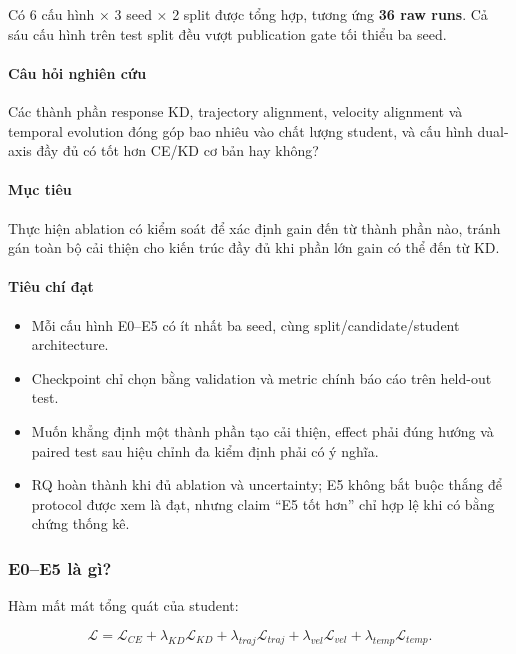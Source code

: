 Có 6 cấu hình × 3 seed × 2 split được tổng hợp, tương ứng \textbf{36 raw runs}. Cả sáu cấu hình trên test split đều vượt publication gate tối thiểu ba seed.

\paragraph{Câu hỏi nghiên cứu}

Các thành phần response KD, trajectory alignment, velocity alignment và temporal evolution đóng góp bao nhiêu vào chất lượng student, và cấu hình dual-axis đầy đủ có tốt hơn CE/KD cơ bản hay không?

\paragraph{Mục tiêu}

Thực hiện ablation có kiểm soát để xác định gain đến từ thành phần nào, tránh gán toàn bộ cải thiện cho kiến trúc đầy đủ khi phần lớn gain có thể đến từ KD.

\paragraph{Tiêu chí đạt}

\begin{itemize}
\item Mỗi cấu hình E0--E5 có ít nhất ba seed, cùng split/candidate/student architecture.
\item Checkpoint chỉ chọn bằng validation và metric chính báo cáo trên held-out test.
\item Muốn khẳng định một thành phần tạo cải thiện, effect phải đúng hướng và paired
test sau hiệu chỉnh đa kiểm định phải có ý nghĩa.

\item RQ hoàn thành khi đủ ablation và uncertainty; E5 không bắt buộc thắng để
protocol được xem là đạt, nhưng claim “E5 tốt hơn” chỉ hợp lệ khi có bằng chứng thống kê.

\end{itemize}

\subsubsection*{E0--E5 là gì?}

Hàm mất mát tổng quát của student:

\[ \mathcal{L} = \mathcal{L}_{CE} + \lambda_{KD}\mathcal{L}_{KD} + \lambda_{traj}\mathcal{L}_{traj} + \lambda_{vel}\mathcal{L}_{vel} + \lambda_{temp}\mathcal{L}_{temp}. \]

